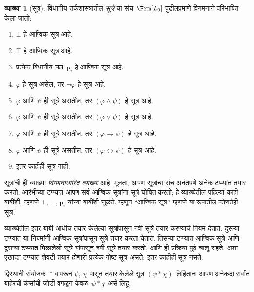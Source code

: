 \documentclass[11pt,a4paper,openany]{book}
\theoremstyle{definition}
\newtheorem{defn}{व्याख्या}[section]
\newenvironment{explain}{}{}
\newcommand{\lif}{\mathbin{\to}}
\newcommand{\liff}{\mathbin{\leftrightarrow}}
\newcommand{\Obj}[1]{\mathsf{#1}}
\newcommand{\lfalse}{\bot}
\newcommand{\ltrue}{\top}
\begin{document}
\begin{defn}[सूत्र]
\label{pl:syn:fml:defn:formulas}
विधानीय तर्कशास्त्रातील \emph{सूत्रे} चा संच~$\Frm[L_0]$
पुढीलप्रमाणे विगमनाने परिभाषित केला जातो:
\begin{enumerate}
\item $\lfalse$ हे आण्विक सूत्र आहे.

\item $\ltrue$ हे आण्विक सूत्र आहे.

\item प्रत्येक विधानीय चल~$\Obj p_i$ हे आण्विक
  सूत्र आहे.

\item $\varphi$ हे सूत्र असेल, तर $\lnot \varphi$ हे
  सूत्र आहे.

\item $\varphi$ आणि $\psi$ ही सूत्रे असतील, तर $(\varphi \land
  \psi)$ हे सूत्र आहे.

\item $\varphi$ आणि $\psi$ ही सूत्रे असतील, तर $(\varphi \lor \psi)$
  हे सूत्र आहे.

\item $\varphi$ आणि $\psi$ ही सूत्रे असतील, तर $(\varphi \lif \psi)$
  हे सूत्र आहे.

\item $\varphi$ आणि $\psi$ ही सूत्रे असतील, तर $(\varphi \liff \psi)$
  हे सूत्र आहे.

\item इतर काहीही सूत्र नाही.
\end{enumerate}
\end{defn}

\begin{explain}
सूत्रांची ही व्याख्या \emph{विगमनाधारित व्याख्या} आहे. मूलतः,
आपण सूत्रांचा संच अनंतपणे अनेक टप्प्यांत तयार करतो. आरंभीच्या
टप्प्यात आपण सर्व आण्विक सूत्रांना सूत्रे घोषित करतो; हे व्याख्येतील
पहिल्या काही बाबींशी, म्हणजे
$\ltrue$, %
$\lfalse$, %
$\Obj p_i$ यांच्या बाबींशी जुळते. म्हणून ``आण्विक सूत्र''
म्हणजे या रूपातील कोणतेही सूत्र.

व्याख्येतील इतर बाबी आधीच तयार केलेल्या सूत्रांपासून नवी
सूत्रे तयार करण्याचे नियम देतात. दुसऱ्या टप्प्यात या नियमांनी
आण्विक सूत्रांपासून सूत्रे तयार करता येतात. तिसऱ्या
टप्प्यात आण्विक सूत्रे आणि दुसऱ्या टप्प्यात मिळालेली सूत्रे यांपासून
नवी सूत्रे तयार करतो, आणि ही प्रक्रिया पुढे चालू राहते. अशा एखाद्या
टप्प्यात शेवटी तयार होणारी प्रत्येक गोष्ट सूत्र असते; इतर
काहीही सूत्र नसते.
\end{explain}

द्विस्थानी संयोजक~$\ast$ वापरून $\psi$, $\chi$ पासून तयार केलेले
सूत्र $(\psi \ast \chi)$ लिहिताना आपण अनेकदा सर्वांत बाहेरची कंसांची
जोडी वगळून केवळ~$\psi \ast \chi$ असे लिहू.
\end{document}

